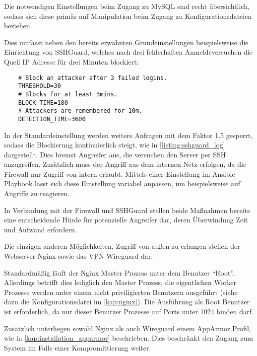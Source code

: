 Die notwendigen Einstellungen beim Zugang zu MySQL sind recht übersichtlich, sodass sich diese primär auf Manipulation beim Zugang zu Konfigurationsdateien beziehen.

Dies umfasst neben den bereits erwähnten Grundeinstellungen beispielsweise die Einrichtung von SSHGuard, welches nach drei fehlerhaften Anmeldeversuchen die Quell IP Adresse für drei Minuten blockiert:

\begin{verbatim}
	# Block an attacker after 3 failed logins.
	THRESHOLD=30
	# Blocks for at least 3mins.
	BLOCK_TIME=180
	# Attackers are remembered for 10m.
	DETECTION_TIME=3600
\end{verbatim}

In der Standardeinstellung werden weitere Anfragen mit dem Faktor 1.5 gesperrt, sodass die Blockierung kontinuierlich steigt, wie in \autoref{listing:sshguard_log} dargestellt. Dies bremst Angreifer aus, die versuchen den Server per SSH anzugreifen. Zusätzlich muss der Angriff aus dem internen Netz erfolgen, da die Firewall nur Zugriff von intern erlaubt. Mittels einer Einstellung im Ansible Playbook lässt sich diese Einstellung variabel anpassen, um beispielsweise auf Angriffe zu reagieren.

In Verbindung mit der Firewall und SSHGuard stellen beide Maßnahmen bereits eine entscheidende Hürde für potenzielle Angreifer dar, deren Überwindung Zeit und Aufwand erfordern.

Die einzigen anderen Möglichkeiten, Zugriff von außen zu erlangen stellen der Webserver Nginx sowie das \ac{VPN} Wireguard dar.

Standardmäßig läuft der Nginx Master Prozess unter dem Benutzer \enquote{Root}. Allerdings betrifft dies lediglich den Master Prozess, die eigentlichen Worker Prozesse werden unter einem nicht priviligierten Benutzern ausgeführt (siehe dazu die Konfigurationsdatei im \autoref{kap:nginx}). Die Ausführung als Root Benutzer ist erforderlich, da nur dieser Benutzer Prozesse auf Ports unter 1024 binden darf. 

Zusätzlich unterliegen sowohl Nginx als auch Wireguard einem AppArmor Profil, wie in \autoref{kap:installation_apparmor} beschrieben. Dies beschränkt den Zugang zum System im Falle einer Kompromittierung weiter.

